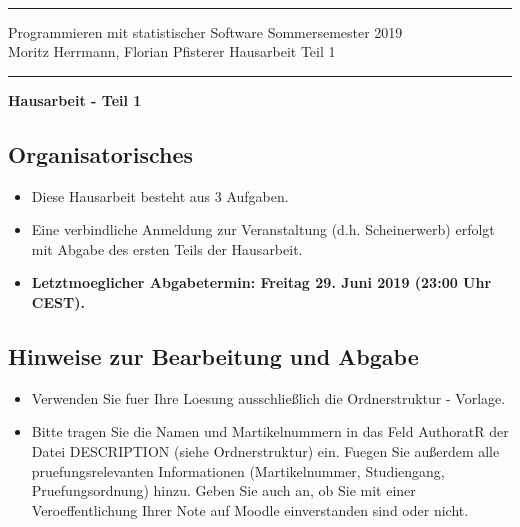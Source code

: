 \documentclass[a4paper]{article}
\begin{document}
  \sloppy \thispagestyle{empty} \setlength{\parindent}{0cm}
  \rule{0cm}{0cm}
  \vspace{-3.8cm}\\

  {\hrule \vspace{.2cm} {\sfbold Programmieren mit statistischer Software}\hfill
    {\sfbold Sommersemester 2019}\\
    {\sfbold Moritz Herrmann, Florian Pfisterer}\hfill {\sfbold
      Hausarbeit Teil 1}


    \vspace{.2cm} \hrule \vspace{1.5cm}

    \begin{center}
      {\bf \LARGE Hausarbeit - Teil 1}
    \end{center}

    \subsection*{Organisatorisches}
    \begin{itemize}
      \item Diese Hausarbeit besteht aus {3 Aufgaben}.
      \item Eine verbindliche Anmeldung zur Veranstaltung (d.h. Scheinerwerb) erfolgt mit Abgabe des ersten Teils der Hausarbeit.
      \item {\bf Letztmoeglicher Abgabetermin: Freitag 29. Juni 2019 (23:00 Uhr CEST).}\\
    \end{itemize}

    \subsection*{Hinweise zur Bearbeitung und Abgabe}

    \begin{itemize}
      \item Verwenden Sie fuer Ihre Loesung ausschließlich die Ordnerstruktur - Vorlage.

      \item Bitte tragen Sie die Namen und Martikelnummern in das Feld AuthoratR der Datei DESCRIPTION (siehe Ordnerstruktur) ein.
       Fuegen Sie außerdem alle pruefungsrelevanten Informationen (Martikelnummer, Studiengang, Pruefungsordnung) hinzu.
       Geben Sie auch an, ob Sie mit einer Veroeffentlichung Ihrer Note auf Moodle einverstanden sind oder nicht.


\end{itemize}}
\end{document}
